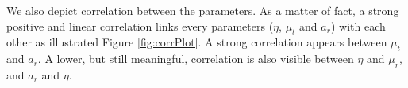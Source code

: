 \documentclass[soumission]{jsfds}
\begin{document}
 



We also depict correlation between the parameters. As a matter of fact, a strong positive and linear correlation links every parameters ($\eta$, $\mu_t$ and $a_r$) with each other as illustrated Figure \ref{fig:corrPlot}. A strong correlation appears between $\mu_t$ and $a_r$. A lower, but still meaningful, correlation is also visible between $\eta$ and $\mu_r$, and $a_r$ and $\eta$.\newline
\end{document}
